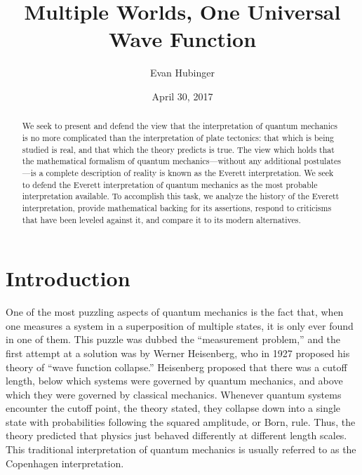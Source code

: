 \documentclass[
    12pt,
    letterpaper,
    aps,
    prd,
    longbibliography,
    twocolumn,
    nofootinbib,
    raggedbottom,
    amsmath,
    amssymb,
    amsfonts,
]{revtex4-1}
\begin{document}
\title{Multiple Worlds, One Universal Wave Function}
\author{Evan Hubinger}
\date{April 30, 2017}

\begin{abstract}
We seek to present and defend the view that the interpretation of quantum mechanics is no more complicated than the interpretation of plate tectonics: that which is being studied is real, and that which the theory predicts is true. The view which holds that the mathematical formalism of quantum mechanics---without any additional postulates---is a complete description of reality is known as the Everett interpretation. We seek to defend the Everett interpretation of quantum mechanics as the most probable interpretation available. To accomplish this task, we analyze the history of the Everett interpretation, provide mathematical backing for its assertions, respond to criticisms that have been leveled against it, and compare it to its modern alternatives.
\end{abstract}

\maketitle

\section{Introduction}

One of the most puzzling aspects of quantum mechanics is the fact that, when one measures a system in a superposition of multiple states, it is only ever found in one of them. This puzzle was dubbed the ``measurement problem,'' and the first attempt at a solution was by Werner Heisenberg, who in 1927 proposed his theory of ``wave function collapse.''\cite{heisenberg} Heisenberg proposed that there was a cutoff length, below which systems were governed by quantum mechanics, and above which they were governed by classical mechanics. Whenever quantum systems encounter the cutoff point, the theory stated, they collapse down into a single state with probabilities following the squared amplitude, or Born, rule. Thus, the theory predicted that physics just behaved differently at different length scales. This traditional interpretation of quantum mechanics is usually referred to as the Copenhagen interpretation.
\end{document}
